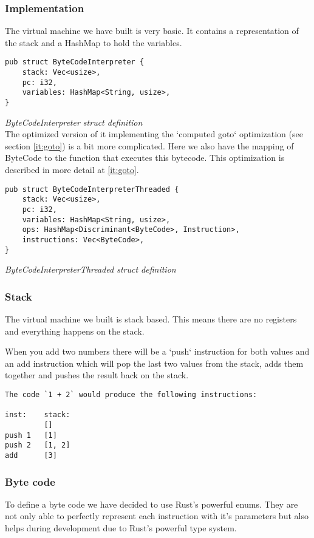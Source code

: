 \documentclass{article}
\begin{document}
\subsubsection{Implementation}
The virtual machine we have built is very basic. It contains a representation
of the stack and a HashMap to hold the variables.

\begin{verbatim}
pub struct ByteCodeInterpreter {
    stack: Vec<usize>,
    pc: i32,
    variables: HashMap<String, usize>,
}
\end{verbatim}
\textit{ByteCodeInterpreter struct definition} \\

The optimized version of it implementing the `computed goto` optimization (see
section \ref{it:goto}) is a bit more complicated. Here we also have the mapping
of ByteCode to the function that executes this bytecode. This optimization is 
described in more detail at \ref{it:goto}.

\begin{verbatim}
pub struct ByteCodeInterpreterThreaded {
    stack: Vec<usize>,
    pc: i32,
    variables: HashMap<String, usize>,
    ops: HashMap<Discriminant<ByteCode>, Instruction>,
    instructions: Vec<ByteCode>,
}
\end{verbatim}
\textit{ByteCodeInterpreterThreaded struct definition} \\


\subsubsection{Stack}
The virtual machine we built is stack based. This means there are no registers
and everything happens on the stack.

When you add two numbers there will be a `push` instruction for both values
and an add instruction which will pop the last two values from the stack,
adds them together and pushes the result back on the stack.

\begin{verbatim}
The code `1 + 2` would produce the following instructions:

inst:    stack:
         []
push 1   [1]
push 2   [1, 2]
add      [3]
\end{verbatim}

\subsubsection{Byte code}
To define a byte code we have decided to use Rust's powerful enums. They are
not only able to perfectly represent each instruction with it's parameters but
also helps during development due to Rust's powerful type system.
\end{document}
